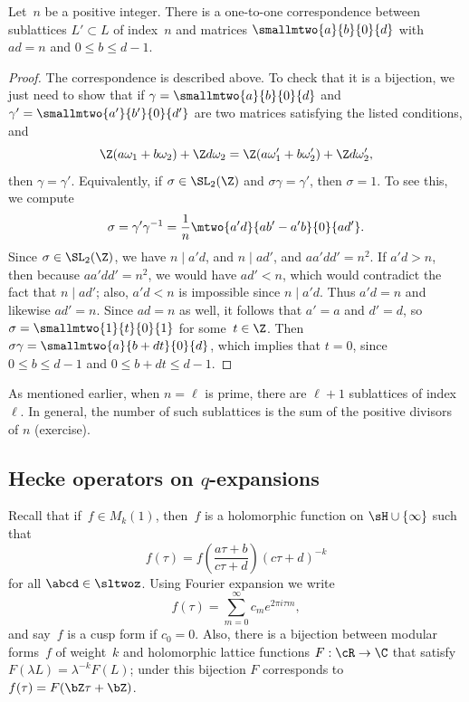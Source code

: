 \documentclass{report}
\begin{document}
\begin{proposition}
Let~$n$ be a positive integer.  There is a one-to-one
correspondence between sublattices $L'\subset L$ of index~$n$ and
matrices $\smallmtwo{a}{b}{0}{d}$ with $ad=n$ and $0\leq b\leq
d-1$.
\end{proposition}
\begin{proof}
The correspondence is described above.   To check that it is a
bijection, we just need to show that if
$\gamma=\smallmtwo{a}{b}{0}{d}$ and
$\gamma'=\smallmtwo{a'}{b'}{0}{d'}$ are two matrices satisfying
the listed conditions, and
\[
  \Z (a\omega_1 + b\omega_2) + \Z d \omega_2
     =
  \Z (a\omega_1' + b\omega_2') + \Z d \omega_2',
\]
then $\gamma=\gamma'$. Equivalently, if $\sigma\in\SL_2(\Z)$ and
$\sigma\gamma=\gamma'$, then $\sigma=1$.   To see this, we compute
\[
  \sigma = \gamma'\gamma^{-1}
         = \frac{1}{n}\mtwo{a'd}{ab'-a'b}{0}{ad'}.
\]
Since $\sigma\in\SL_2(\Z)$, we have $n\mid a'd$, and $n\mid ad'$,
and $aa'dd'=n^2$. If $a'd>n$, then because $aa'dd'=n^2$, we would
have $ad'<n$, which would contradict the fact that $n\mid ad'$;
also, $a'd<n$ is impossible since $n\mid a'd$. Thus $a'd=n$ and
likewise $ad'=n$. Since $ad=n$ as well, it follows that $a'=a$ and
$d'=d$, so $\sigma=\smallmtwo{1}{t}{0}{1}$ for some~$t\in\Z$. Then
$\sigma\gamma=\smallmtwo{a}{b+dt}{0}{d}$, which implies that
$t=0$, since $0\leq b\leq  d-1$ and $0\leq b+dt\leq d-1$.
\end{proof}

\begin{remark}
As mentioned earlier, when $n=\ell$ is prime, there are $\ell+1$
sublattices of index~$\ell$. In general, the number of such
sublattices is the sum of the positive divisors of $n$
(exercise).
\end{remark}

\subsection{Hecke operators on $q$-expansions}\label{sec:heckeonq}
Recall that if~$f\in M_k(1)$, then~$f$ is a holomorphic function
on $\sH\cup\{\infty\}$ such that
\[
  f(\tau)=f\left(\frac{a\tau+b}{c\tau+d}\right)(c\tau+d)^{-k}
\]
for all $\abcd\in\sltwoz$.  Using Fourier expansion we write
\[
  f(\tau)=\sum_{m=0}^{\infty} c_m e^{2\pi i\tau m},
\]
and say~$f$ is a cusp form if $c_0=0$.  Also, there is a bijection
between modular forms~$f$ of weight~$k$ and holomorphic lattice
functions $F:\cR\to\C$ that satisfy $F(\lambda
L)=\lambda^{-k}F(L)$; under this bijection $F$ corresponds to
$f(\tau)=F(\bZ\tau+\bZ)$.
\end{document}
